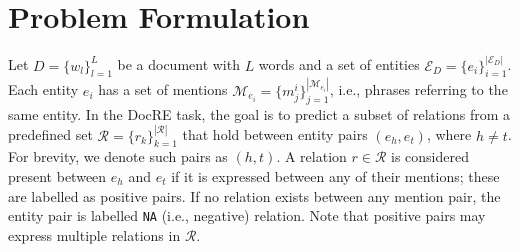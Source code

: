 \section{Problem Formulation}
Let $D = \{w_l\}_{l=1}^{L}$ be a document with $L$ words and a set of entities $\mathcal{E}_D = \{e_i\}_{i=1}^{|\mathcal{E}_D|}$. Each entity $e_i$ has a set of mentions $\mathcal{M}_{e_i} = \{m^i_j\}_{j=1}^{|\mathcal{M}_{e_i}|}$, i.e., phrases referring to the same entity. In the DocRE task, the goal is to predict a subset of relations from a predefined set $\mathcal{R} = \{r_k\}_{k=1}^{|\mathcal{R}|}$ that hold between entity pairs $(e_h, e_t)$, where $h \neq t$. For brevity, we denote such pairs as $(h, t)$. A relation $r \in \mathcal{R}$ is considered present between $e_h$ and $e_t$ if it is expressed between any of their mentions; these are labelled as positive pairs. If no relation exists between any mention pair, the entity pair is labelled {\tt NA} (i.e., negative) relation. Note that positive pairs may express multiple relations in $\mathcal{R}$.
